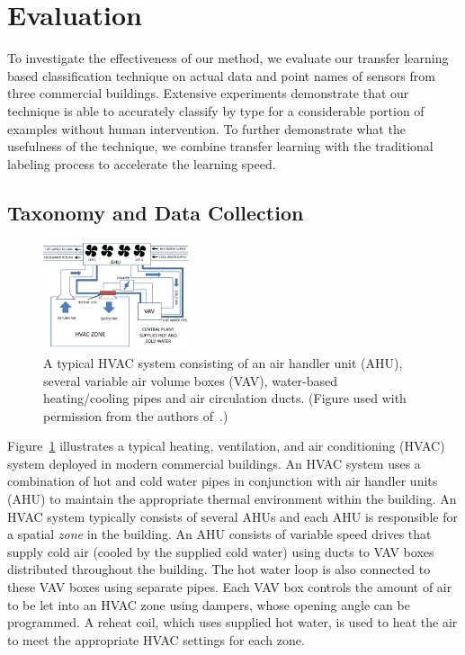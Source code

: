 \section{Evaluation}
To investigate the effectiveness of our method, we evaluate our transfer learning based classification technique on actual data and point names of sensors from three commercial buildings. Extensive experiments demonstrate that our technique is able to accurately classify by type for a considerable portion of examples without human intervention. 
To further demonstrate what the usefulness of the technique, we combine transfer learning with the traditional labeling process to accelerate the learning speed.


\subsection{Taxonomy and Data Collection}
\begin{figure}[t]
\centering
\includegraphics[width=0.38\textwidth]{./fig/hvac}
\caption{A typical HVAC system consisting of an air handler unit (AHU), several variable air volume boxes (VAV), water-based heating/cooling pipes and air circulation ducts. (Figure used with permission from the authors of~\cite{sentinel}.)}
\label{fig:hvac}
\end{figure}

Figure~\ref{fig:hvac} illustrates a typical heating, ventilation, and air conditioning (HVAC) system deployed in modern commercial buildings. 
An HVAC system uses a combination of hot and cold water pipes in conjunction with
air handler units (AHU) to maintain the appropriate thermal environment within the building.
An HVAC system typically consists of several AHUs and each AHU is responsible for a spatial \emph{zone}
in the building. An AHU consists of variable speed drives that supply cold air
(cooled by the supplied cold water) using ducts to VAV boxes distributed throughout the building.
The hot water loop is also connected to these VAV boxes using separate pipes. Each VAV box
controls the amount of air to be let into an HVAC zone using dampers, whose opening angle
can be programmed. A reheat coil, which uses supplied hot water, is used to heat the air to
meet the appropriate HVAC settings for each zone.

